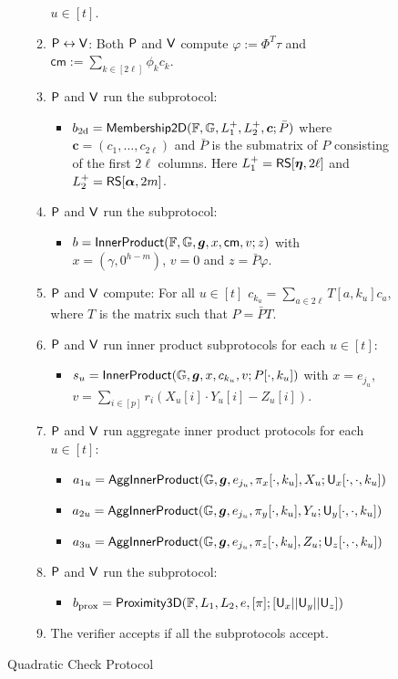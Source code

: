 \begin{figure}[h!]
\begin{framed}
\begin{itemize}
\begin{enumerate}[{\rm 1.}]
$u\in [t]$.
\item $\mathsf{P}\leftrightarrow\mathsf{V}$: Both $\mathsf{P}$ and $\mathsf{V}$ compute
$\varphi := \Phi^T\tau$ and $\mathsf{cm}:= \sum_{k\in [2\ell]}\phi_kc_k$.
\item $\mathsf{P}$ and $\mathsf{V}$ run the subprotocol:
	\begin{itemize}
	\item $b_{\rm
2d}=\mathsf{Membership2D}(\mathbb{F},\mathbb{G},L^{+}_1,L^{+}_2,\bm{c};\bar{P})$ where
$\bm{c}=(c_1,\ldots,c_{2\ell})$ and $\bar{P}$ is the submatrix of $P$ consisting
of the first $2\ell$ columns. Here $L^{+}_1=\mathsf{RS}[\bm{\eta},2\ell]$ and
$L^{+}_2=\mathsf{RS}[\bm{\alpha},2m]$.
	\end{itemize}
\item $\mathsf{P}$ and $\mathsf{V}$ run the subprotocol:
	\begin{itemize}
	\item $b=\mathsf{InnerProduct}(\mathbb{F},\mathbb{G},\bm{g},x,\mathsf{cm},v;z)$
with $x=(\gamma,0^{h-m})$, $v=0$ and $z=\bar{P}\varphi$.
	\end{itemize}
\item $\mathsf{P}$ and $\mathsf{V}$ compute: For all $u\in [t]$ $c_{k_u} =
\sum_{a\in 2\ell}T[a,k_u]c_a$, where $T$ is the matrix such that $P=\bar{P}T$.
\item $\mathsf{P}$ and $\mathsf{V}$ run inner product subprotocols for each $u\in
[t]$:
	\begin{itemize}
	\item $s_u=\mathsf{InnerProduct}(\mathbb{G},\bm{g},x,c_{k_u},v;P[\cdot,k_u])$ with
$x=e_{j_u}$, $v=\sum_{i\in [p]}r_i(X_u[i]\cdot Y_u[i] - Z_u[i])$.
	\end{itemize}
\item $\mathsf{P}$ and $\mathsf{V}$ run aggregate inner product protocols for each
$u\in [t]$:
	\begin{itemize}
	\item
$a_{1u}=\mathsf{AggInnerProduct}(\mathbb{G},\bm{g},e_{j_u},\pi_x[\cdot,k_u],X_u;\mathsf{U}_x[\cdot,\cdot,k_u])$
	\item
$a_{2u}=\mathsf{AggInnerProduct}(\mathbb{G},\bm{g},e_{j_u},\pi_y[\cdot,k_u],Y_u;\mathsf{U}_y[\cdot,\cdot,k_u])$
	\item
$a_{3u}=\mathsf{AggInnerProduct}(\mathbb{G},\bm{g},e_{j_u},\pi_z[\cdot,k_u],Z_u;\mathsf{U}_z[\cdot,\cdot,k_u])$
	\end{itemize}
\item $\mathsf{P}$ and $\mathsf{V}$ run the subprotocol: 
	\begin{itemize}
	\item $b_{\rm prox} =
\mathsf{Proximity3D}(\mathbb{F},L_1,L_2,e,[\pi];[\mathsf{U}_x||\mathsf{U}_y||\mathsf{U}_z])$
	\end{itemize}
\item The verifier accepts if all the subprotocols accept.
\end{enumerate}
\end{itemize}
\end{framed}
\caption{Quadratic Check Protocol}
\label{fig:quadcheck}
\end{figure}



